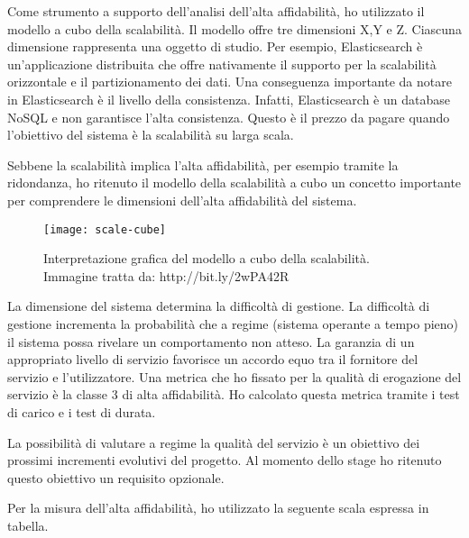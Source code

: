 Come strumento a supporto dell'analisi dell'alta affidabilità, 
ho utilizzato il modello a cubo della scalabilità. 
Il modello offre tre dimensioni X,Y e Z. Ciascuna dimensione 
rappresenta una oggetto di studio. Per esempio, Elasticsearch
è un'applicazione distribuita che offre nativamente 
il supporto per la scalabilità orizzontale e il partizionamento 
dei dati. Una conseguenza importante da notare in Elasticsearch
è il livello della consistenza. Infatti, Elasticsearch è un 
database NoSQL e non garantisce l'alta consistenza. Questo
è il prezzo da pagare quando l'obiettivo del sistema è la scalabilità
su larga scala.

Sebbene la scalabilità implica l'alta affidabilità, 
per esempio tramite la ridondanza, ho ritenuto 
il modello della scalabilità a cubo un concetto 
importante per comprendere le dimensioni 
dell'alta affidabilità del sistema.

\begin{figure}[htbp]
	\begin{center}
		\texttt{[image: scale-cube]}
		\caption{Interpretazione grafica del modello a cubo della scalabilità.
		        Immagine tratta da: http://bit.ly/2wPA42R}
	\end{center}
\end{figure}

La dimensione del sistema determina la difficoltà di gestione. 
La difficoltà di gestione incrementa la probabilità
che a regime (sistema operante a tempo pieno) il sistema
possa rivelare un comportamento non atteso. La garanzia di un appropriato
livello di servizio favorisce un accordo equo tra il fornitore del
servizio e l'utilizzatore. Una metrica che ho 
fissato per la qualità di erogazione del servizio è la classe 3 
di alta affidabilità. Ho calcolato questa metrica tramite 
i test di carico e i test di durata. 

La possibilità di valutare a regime la qualità del servizio 
è un obiettivo dei prossimi incrementi evolutivi del progetto. 
Al momento dello stage ho ritenuto questo obiettivo un requisito opzionale.

Per la misura dell'alta affidabilità,
ho utilizzato la seguente scala espressa in tabella.

